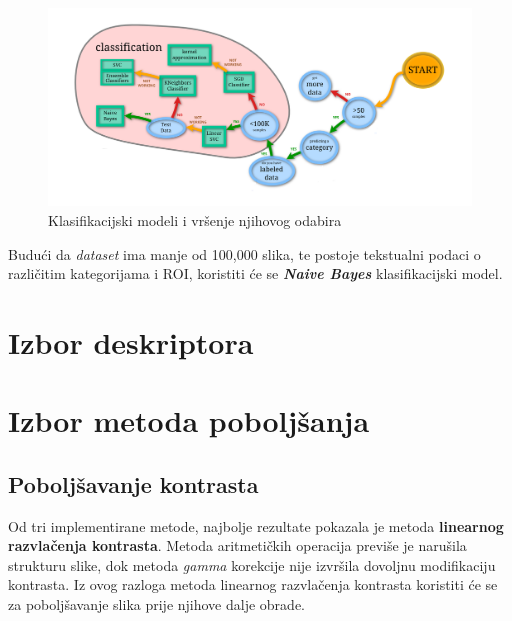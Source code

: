 \documentclass[12pt,a4paper]{article}
\begin{document}
\begin{figure}[H]

\center
\includegraphics[scale=0.35]{slikaModeli.png}
\caption{Klasifikacijski modeli i vršenje njihovog odabira}
	
\end{figure}

Budući da \textit{dataset} ima manje od 100,000 slika, te postoje tekstualni podaci o različitim kategorijama i ROI, koristiti će se \textbf{\textit{Naive Bayes}} klasifikacijski model.

\newpage

\section{Izbor deskriptora}



\newpage

\section{Izbor metoda poboljšanja}

\subsection{Poboljšavanje kontrasta}

Od tri implementirane metode, najbolje rezultate pokazala je metoda \textbf{linearnog razvlačenja kontrasta}. Metoda aritmetičkih operacija previše je narušila strukturu slike, dok metoda \textit{gamma} korekcije nije izvršila dovoljnu modifikaciju kontrasta. Iz ovog razloga metoda linearnog razvlačenja kontrasta koristiti će se za poboljšavanje slika prije njihove dalje obrade.
\end{document}
